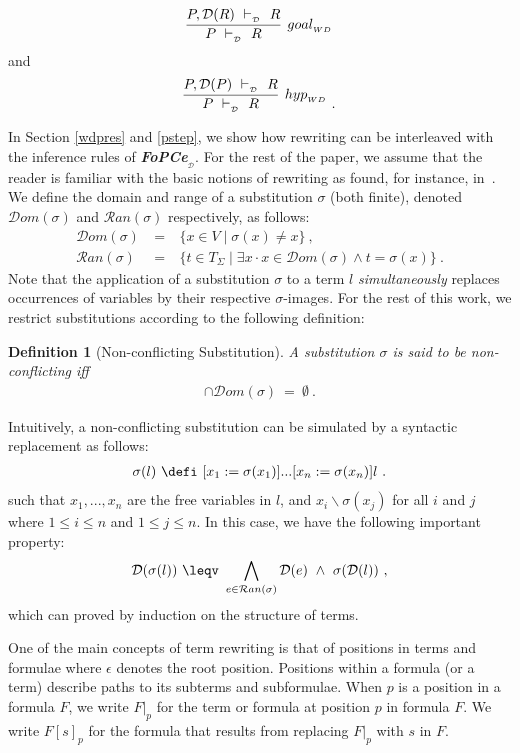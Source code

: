 \documentclass[copyright]{eptcs}
\newtheorem{definition}[theorem]{Definition}
\begin{document}
$$
\infer[goal_{_{WD}}]{P~\vdash_{_\mathcal{D}}~R}{P, \mathcal{D}(R)~\vdash_{_\mathcal{D}}~R}
$$
and
$$
\infer[hyp_{_{WD}}]{P~\vdash_{_\mathcal{D}}~R}{P, \mathcal{D}(P)~\vdash_{_\mathcal{D}}~R}~.
$$
\par
In Section \ref{wdpres} and \ref{pstep}, we show how rewriting can be interleaved with the inference rules of \textbf{\textit{FoPCe}}$_{_\mathcal{D}}$. For the rest of the paper, we assume that the reader is familiar with the basic notions of rewriting as found, for instance, in~\cite{280474}. We define the domain and range of a substitution $\sigma$ (both finite), denoted $\mathcal{D}om(\sigma)$ and $\mathcal{R}an(\sigma)$ respectively, as follows:
\begin{eqnarray*}
\mathcal{D}om(\sigma)&~=~&\{x \in V \mid \sigma(x) \neq x\}~,\\
\mathcal{R}an(\sigma)&~=~&\{t \in T_{\Sigma} \mid \exists x \cdot x \in \mathcal{D}om(\sigma) \land t = \sigma(x)\}~.
\end{eqnarray*}
Note that the application of a substitution $\sigma$ to a term $l$ \textit{simultaneously} replaces occurrences of variables by their respective $\sigma$-images. For the rest of this work, we restrict substitutions according to the following definition:
\begin{definition}[Non-conflicting Substitution]
A substitution $\sigma$ is said to be non-conflicting iff
\begin{eqnarray*}
[\bigcup_{t \in \mathcal{R}an(\sigma)}\mathcal{V}ar(t)] \cap \mathcal{D}om(\sigma)~=~\emptyset~.
\end{eqnarray*}
\end{definition}
Intuitively, a non-conflicting substitution can be simulated by a syntactic replacement as follows:
\begin{eqnarray*}
\sigma(l)~\defi~[x_1:=\sigma(x_1)]...[x_n:=\sigma(x_n)]l~.
\end{eqnarray*}
such that $x_1,...,x_n$ are the free variables in $l$, and $x_i \backslash \sigma(x_j)$ for all $i$ and $j$ where $1\leq i\leq n$ and $1\leq j\leq n$. In this case, we have the following important property:
\begin{eqnarray*}
\mathcal{D}(\sigma(l))~\leqv~\bigwedge_{e \in \mathcal{R}an(\sigma)}\mathcal{D}(e)~\land~\sigma(\mathcal{D}(l))~,
\end{eqnarray*}
which can proved by induction on the structure of terms.
\par
One of the main concepts of term rewriting is that of positions in terms and formulae where $\epsilon$ denotes the root position. Positions within a formula (or a term) describe paths to its subterms and subformulae. When $p$ is a position in a formula $F$, we write $F|_p$ for the term or formula at position $p$ in formula $F$. We write $F[s]_p$ for the formula that results from replacing $F|_p$ with $s$ in $F$. 
\end{document}
